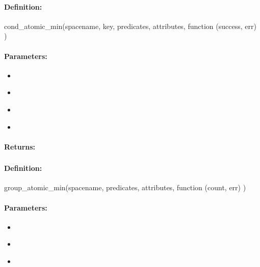 \paragraph{Definition:}
\begin{javascriptcode}
cond_atomic_min(spacename, key, predicates, attributes, function (success, err) {})
\end{javascriptcode}
\paragraph{Parameters:}
\begin{itemize}[noitemsep]
\item {}\\

\item {}\\

\item {}\\

\item {}\\

\end{itemize}

\paragraph{Returns:}


\pagebreak
\subsubsection{}
\label{api:nodejs:group_atomic_min}


\paragraph{Definition:}
\begin{javascriptcode}
group_atomic_min(spacename, predicates, attributes, function (count, err) {})
\end{javascriptcode}
\paragraph{Parameters:}
\begin{itemize}[noitemsep]
\item {}\\

\item {}\\

\item {}\\

\end{itemize}

